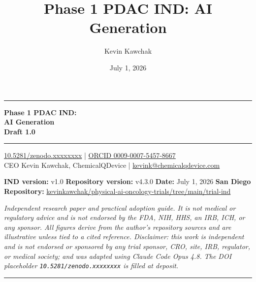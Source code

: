 \documentclass[11pt]{article}
\title{Phase 1 PDAC IND: AI Generation}
\author{Kevin Kawchak}
\date{July 1, 2026}
\begin{document}
\thispagestyle{plain}

\begin{center}
{\color{indink}\rule{\linewidth}{1.6pt}}
{\LARGE\bfseries Phase 1 PDAC IND:\\ \vspace{0.18cm}AI Generation}\\[0.15em]
{\large\bfseries Draft 1.0}\\[-0.1em]
{\color{indink}\rule{\linewidth}{1.6pt}}
\end{center}

\vspace{-0.4cm}

\begin{center}\small
\href{https://doi.org/10.5281/zenodo.xxxxxxxx}{10.5281/zenodo.xxxxxxxx} \;|\;
\href{https://orcid.org/0009-0007-5457-8667}{ORCID 0009-0007-5457-8667} \\
CEO Kevin Kawchak, ChemicalQDevice \;|\;
\href{mailto:kevink@chemicalqdevice.com}{kevink@chemicalqdevice.com}
\end{center}

\vspace{-0.2cm}

\begin{center}\footnotesize
\textbf{IND version:} v1.0 \quad \textbf{Repository version:} v4.3.0 \quad
\textbf{Date:} July 1, 2026 \quad \textbf{San Diego}\\
\textbf{Repository:} \href{https://github.com/kevinkawchak/physical-ai-oncology-trials/tree/main/trial-ind}{kevinkawchak/physical-ai-oncology-trials/tree/main/trial-ind}
\end{center}

\vspace{-0.15cm}

\noindent\footnotesize\textit{Independent research paper and practical adoption
guide. It is not medical or regulatory advice and is not endorsed by the FDA, NIH,
HHS, an IRB, ICH, or any sponsor. All figures derive from the author's repository
sources and are illustrative unless tied to a cited reference. Disclaimer: this
work is independent and is not endorsed or sponsored by any trial sponsor, CRO,
site, IRB, regulator, or medical society; and was adapted using Claude Code Opus
4.8. The DOI placeholder \texttt{10.5281/zenodo.xxxxxxxx} is filled at
deposit.}\normalsize\par

\vspace{-0.2em}
{\color{indink}\rule{\linewidth}{1.6pt}}
\end{document}
